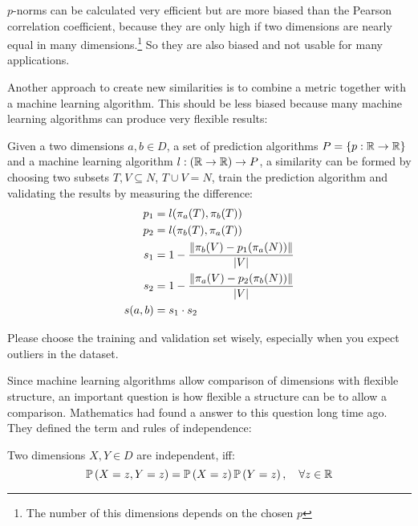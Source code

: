 $p$-norms can be calculated very efficient but are more biased than the Pearson correlation coefficient, because they are only high if two dimensions are nearly equal in many dimensions.\footnote{The number of this dimensions depends on the chosen $p$} So they are also biased and not usable for many applications.

Another approach to create new similarities is to combine a metric together with a machine learning algorithm. This should be less biased because many machine learning algorithms can produce very flexible results:

\begin{envtheo}
	Given a two dimensions $a,b \in D$, a set of prediction algorithms $P = \{ p : \mathbb{R} \rightarrow \mathbb{R} \}$ and a machine learning algorithm $l : (\mathbb{R} \rightarrow \mathbb{R}) \rightarrow P$, a similarity can be formed by choosing two subsets $T,V \subseteq N$, $T \cup V = N$, train the prediction algorithm and validating the results by measuring the difference:
	\begin{align}
		p_1 &= l( \pi_a(T), \pi_b(T) )\\
		p_2 &= l( \pi_b(T), \pi_a(T) )\\
		s_1 &= 1 - \frac{\|\pi_b(V) - p_1(\pi_a(N))\|}{\left|V\right|}\\
		s_2 &= 1 - \frac{\|\pi_a(V) - p_2(\pi_b(N))\|}{\left|V\right|}\\
		s(a,b) &= s_1 \cdot s_2
	\end{align}
\end{envtheo}

Please choose the training and validation set wisely, especially when you expect outliers in the dataset.

Since machine learning algorithms allow comparison of dimensions with flexible structure, an important question is how flexible a structure can be to allow a comparison. Mathematics had found a answer to this question long time ago. They defined the term and rules of independence:

\begin{envdef}[Independence]
	Two dimensions $X,Y \in D$ are independent, iff:
	\begin{equation}
		\mathbb{P}\left(X=z,Y=z\right) = \mathbb{P}\left(X=z\right)\mathbb{P}\left(Y=z\right),\quad \forall z \in \mathbb{R}
	\end{equation}
\end{envdef}

